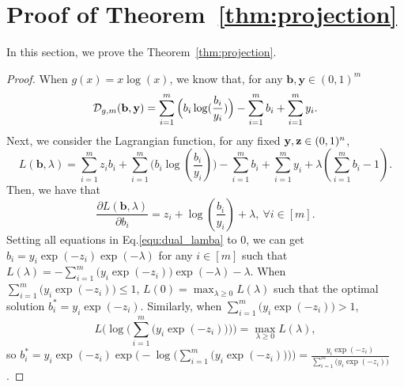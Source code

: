 	\section{Proof of Theorem~\ref{thm:projection}}\label{append:proof4}
	In this section, we prove the Theorem~\ref{thm:projection}.
	\begin{proof}
	When $g(x)=x\log(x)$, we know that, for any $\mathbf{b},\mathbf{y}\in(0,1)^{m}$ 
	\begin{equation*}
	\mathcal{D}_{g,m}(\mathbf{b}, \mathbf{y})=\sum_{i=1}^{m}\Big(b_{i}\log(\frac{b_{i}}{y_{i}})\Big)-\sum_{i=1}^{m}b_{i}+\sum_{i=1}^{m}y_{i}.
	\end{equation*}
	Next, we consider the Lagrangian function, for any fixed $\mathbf{y},\mathbf{z}\in(0,1)^{n}$,
	\begin{equation*}
L(\mathbf{b},\lambda)=\sum_{i=1}^{m}z_{i}b_{i}+\sum_{i=1}^{m}\Big(b_{i}\log(\frac{b_{i}}{y_{i}})\Big)-\sum_{i=1}^{m}b_{i}+\sum_{i=1}^{m}y_{i}+\lambda(\sum_{i=1}^{m}b_{i}-1).
	\end{equation*}
Then, we have that
\begin{equation}\label{equ:dual_lamba}
	\frac{\partial L(\mathbf{b},\lambda)}{\partial b_{i}}=z_{i}+\log(\frac{b_{i}}{y_{i}})+\lambda,\ \forall i\in[m].
\end{equation}
Setting all equations in Eq.\eqref{equ:dual_lamba} to $0$, we can get $b_{i}=y_{i}\exp(-z_{i})\exp(-\lambda)$ for any $i\in[m]$ such that $L(\lambda)=-\sum_{i=1}^{m}\Big(y_{i}\exp(-z_{i})\Big)\exp(-\lambda)-\lambda$. When $\sum_{i=1}^{m}\Big(y_{i}\exp(-z_{i})\Big)\le 1$, $L(0)=\max_{\lambda\ge0}L(\lambda)$ such that the optimal solution $b_{i}^{*}=y_{i}\exp(-z_{i})$. Similarly, when $\sum_{i=1}^{m}\Big(y_{i}\exp(-z_{i})\Big)>1$,
\begin{equation*}
L\Bigg(\log\Big(\sum_{i=1}^{m}\big(y_{i}\exp(-z_{i})\big)\Big)\Bigg)=\max_{\lambda\ge0}L(\lambda),
\end{equation*} so $b_{i}^{*}=y_{i}\exp(-z_{i})\exp\Bigg(-\log\Big(\sum_{i=1}^{m}\big(y_{i}\exp(-z_{i})\big)\Big)\Bigg)=\frac{y_{i}\exp(-z_{i})}{\sum_{i=1}^{m}\big(y_{i}\exp(-z_{i})\big)}$.
\end{proof}
